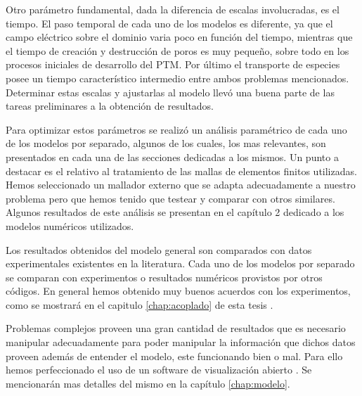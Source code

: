 Otro parámetro fundamental, dada la diferencia de escalas involucradas, es el tiempo. El paso temporal de cada uno de los modelos es diferente, ya que el campo eléctrico sobre el dominio varia poco en función del tiempo, mientras que el tiempo de creación y destrucción de poros es muy pequeño, sobre todo en los procesos iniciales de desarrollo del PTM. Por último el transporte de especies posee un tiempo característico intermedio entre ambos problemas mencionados. Determinar estas escalas y ajustarlas al modelo llevó una buena parte de las tareas preliminares a la obtención de resultados.

Para optimizar estos parámetros se realizó un análisis paramétrico de cada uno de los modelos por separado, algunos de los cuales, los mas relevantes, son presentados en cada una de las secciones dedicadas a los mismos. 
Un punto a destacar es el relativo al tratamiento de las mallas de elementos finitos utilizadas. Hemos seleccionado un mallador externo \cite{automesh} que se adapta adecuadamente a nuestro problema pero que hemos tenido que testear y comparar con otros similares. Algunos resultados de este análisis se presentan en el capítulo 2 dedicado a los modelos numéricos utilizados.

Los resultados obtenidos del modelo general son comparados con datos experimentales existentes en la literatura. Cada uno de los modelos por separado se comparan con experimentos o resultados numéricos provistos por otros códigos. En general hemos obtenido muy buenos acuerdos con los experimentos, como se mostrará en el capitulo \ref{chap:acoplado} de esta tesis \cite{c6-fodava, krass07, c8}.

 Problemas complejos proveen una gran cantidad de resultados que es necesario manipular adecuadamente para poder manipular la información que dichos datos proveen además de entender el modelo, este funcionando bien o mal. Para ello hemos perfeccionado el uso de un software de visualización abierto \cite{c16}. Se mencionarán mas detalles del mismo en la capítulo \ref{chap:modelo}.
